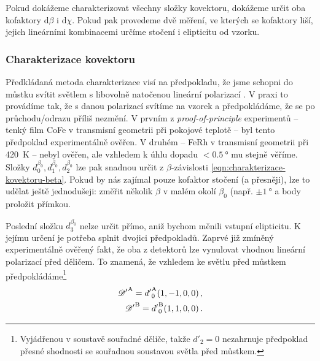 Pokud dokážeme charakterizovat všechny složky kovektoru, dokážeme určit oba kofaktory $\textrm{d}\beta$ i $\textrm{d}\chi$.
Pokud pak provedeme dvě měření, ve kterých se kofaktory liší, jejich lineárními kombinacemi určíme stočení i elipticitu od vzorku.

\subsubsection*{Charakterizace kovektoru}

Předkládaná metoda charakterizace visí na předpokladu, že jsme schopni do můstku svítit světlem s libovolně natočenou lineární polarizací \beta.
V praxi to provádíme tak, že s danou polarizací svítíme na vzorek a předpokládáme, že se po průchodu/odrazu příliš nezmění.
V prvním z \emph{proof-of-principle} experimentů -- tenký film CoFe v transmisní geometrii při pokojové teplotě -- byl tento předpoklad experimentálně ověřen.
V druhém -- FeRh v transmisní geometrii při \SI{420}{\kelvin} -- nebyl ověřen, ale vzhledem k úhlu dopadu $<\SI{0.5}{\degree}$ mu stejně věříme.
Složky $d^{\beta_0}_0, d^{\beta_0}_1, d^{\beta_0}_2$ lze pak snadnou určit z $\beta$-závislosti \eqref{eqn:charakterizace-kovektoru-beta}.
Pokud by nás zajímal pouze kofaktor stočení (a přesněji), lze to udělat ještě jednodušeji: změřit několik $\beta$ v malém okolí $\beta_0$ (např. $\pm\SI{1}{\degree}$ a body proložit přímkou.


Poslední složku $d^{\beta_0}_3$ nelze určit přímo, aniž bychom měnili vstupní elipticitu.
K jejímu určení je potřeba splnit dvojici předpokladů.
Zaprvé již zmíněný experimentálně ověřený fakt, že oba z detektorů lze vynulovat vhodnou lineární polarizací před děličem.
To znamená, že vzhledem ke světlu před můstkem předpokládáme\footnote{Vyjádřenou v soustavě souřadné děliče, takže $d'_2=0$ nezahrnuje předpoklad přesné shodnosti se souřadnou soustavou světla před můstkem.}
\begin{align}
\label{eqn:kovektory-det-elipticita}
{\mathscr{D}'}^\textrm{A} = {d'}^{\textrm{A}}_0(1, -1, 0, 0) \,,\\
{\mathscr{D}'}^\textrm{B} = {d'}^\textrm{B}_0(1, 1, 0, 0) \,.
\end{align}

